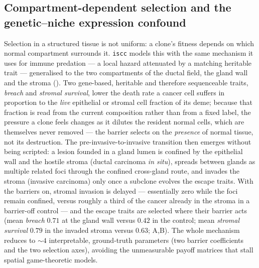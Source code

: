 \documentclass{article}
\begin{document}
\subsection{Compartment-dependent selection and the genetic--niche expression confound}
\label{sec:compartment}
Selection in a structured tissue is not uniform: a clone's fitness depends on which normal
compartment surrounds it. \texttt{iscc} models this with the same mechanism it uses for immune
predation --- a local hazard attenuated by a matching heritable trait --- generalised to the two
compartments of the ductal field, the gland wall and the stroma (). Two
gene-based, heritable and therefore sequenceable traits, \emph{breach} and \emph{stromal survival},
lower the death rate a cancer cell suffers in proportion to the \emph{live} epithelial or stromal
cell fraction of its deme; because that fraction is read from the current composition rather than
from a fixed label, the pressure a clone feels changes as it dilutes the resident normal cells, which
are themselves never removed --- the barrier selects on the \emph{presence} of normal tissue, not its
destruction. The pre-invasive-to-invasive transition then emerges without being scripted: a lesion
founded in a gland lumen is confined by the epithelial wall and the hostile stroma (ductal carcinoma
\textit{in situ}), spreads between glands as multiple related foci through the confined cross-gland
route, and invades the stroma (invasive carcinoma) only once a subclone evolves the escape traits.
With the barriers on, stromal invasion is delayed --- essentially zero while the foci remain confined,
versus roughly a third of the cancer already in the stroma in a barrier-off control --- and the escape
traits are selected where their barrier acts (mean \emph{breach} $0.71$ at the gland wall versus
$0.42$ in the control; mean \emph{stromal survival} $0.79$ in the invaded stroma versus $0.63$;
A,B).
The whole mechanism reduces to $\sim\!4$ interpretable, ground-truth parameters (two barrier
coefficients and the two selection axes), avoiding the unmeasurable payoff matrices that stall
spatial game-theoretic models.
\end{document}
